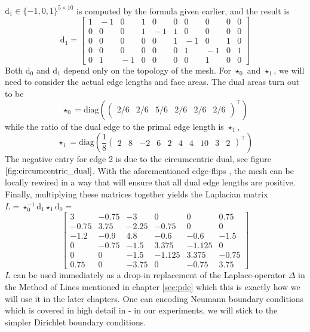\\ $\text{d}_1 \in \{-1, 0, 1\}^{5 \times 10}$ is computed by the formula given earlier, and the result is
$$\text{d}_1 = \left[\begin{array}{rrrrrrrrrr}
1 & \!\!\!-1 &  0 &  1 &  0 &  0 &  0 &  0 &  0 &  0
\\ 0 &  0 &  0 &  1 & \!\!\!-1 &  1 &  0 &  0 &  0 &  0
\\ 0 &  0 &  0 &  0 &  0 &  1 & \!\!\!-1 &  0 &  1 &  0
\\ 0 &  0 &  0 &  0 &  0 &  0 &  1 & \!\!\!-1 &  0 &  1
\\ 0 &  1 & \!\!\!-1 &  0 &  0 &  0 &  0 &  1 &  0 &  0
\end{array}\right]$$
Both $\text{d}_0$ and $\text{d}_1$ depend only on the topology of the mesh. For $\star_0$ and $\star_1$, we will need to consider the actual edge lengths and face areas.
The dual areas turn out to be 
$$\star_0 = \text{diag} (\begin{pmatrix}
    2/6 & 2/6 & 5/6 & 2/6 & 2/6 & 2/6 \end{pmatrix}^\top)$$
while the ratio of the dual edge to the primal edge length is $\star_1$,
$$\star_1 = \text{diag} (\frac{1}{8}\begin{pmatrix}
   2 & 8 & -2 & 6 & 2 & 4 & 4 & 10 & 3 & 2 \end{pmatrix}^\top)$$
The negative entry for edge 2 is due to the circumcentric dual, see figure $\ref{fig:circumcentric_dual}$. With the aforementioned edge-flips \cite{sharp2021intrinsic}, the mesh can be locally rewired in a way that will ensure that all dual edge lengths are positive.
\\
Finally, multiplying these matrices together yields the Laplacian matrix $L = \star_0^{-1} \text{d}_1\star_1\text{d}_0 = $
$$\left[\!\!\begin{array}{rrrrrr}
     3   & -0.75 & -3   &  0  &  0  &  0.75 
    \\-0.75 &  3.75 & -2.25 & -0.75 &  0  &  0  
    \\-1.2  & -0.9  &  4.8  & -0.6  & -0.6  & -1.5  
    \\ 0  & -0.75 & -1.5  &  3.375& -1.125&  0  
    \\ 0  &  0  & -1.5  & -1.125&  3.375& -0.75 
    \\ 0.75 &  0  & -3.75 &  0  & -0.75 &  3.75 
\end{array}\!\!\right]$$
$L$ can be used immediately as a drop-in replacement of the Laplace-operator $\Delta$ in the Method of Lines mentioned in chapter \ref{sec:pde} which this is exactly how we will use it in the later chapters. One can encoding Neumann boundary conditions which is covered in high detail in \cite{craneDDG} - in our experiments, we will stick to the simpler Dirichlet boundary conditions.
\ifdefined\COMPILINGFROMMAIN
\else    
    
\fi